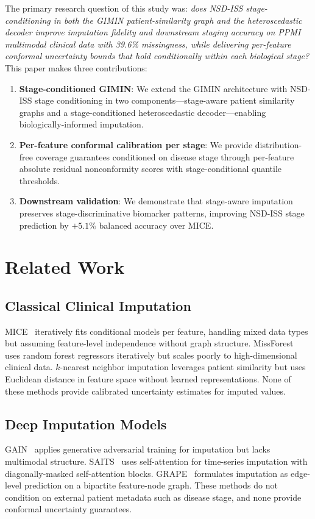 The primary research question of this study was: \emph{does NSD-ISS stage-conditioning in both the GIMIN patient-similarity graph and the heteroscedastic decoder improve imputation fidelity and downstream staging accuracy on PPMI multimodal clinical data with 39.6\% missingness, while delivering per-feature conformal uncertainty bounds that hold conditionally within each biological stage?} This paper makes three contributions:
\begin{enumerate}
    \item \textbf{Stage-conditioned GIMIN}: We extend the GIMIN architecture with NSD-ISS stage conditioning in two components---stage-aware patient similarity graphs and a stage-conditioned heteroscedastic decoder---enabling biologically-informed imputation.
    \item \textbf{Per-feature conformal calibration per stage}: We provide distribution-free coverage guarantees conditioned on disease stage through per-feature absolute residual nonconformity scores with stage-conditional quantile thresholds.
    \item \textbf{Downstream validation}: We demonstrate that stage-aware imputation preserves stage-discriminative biomarker patterns, improving NSD-ISS stage prediction by $+5.1\%$ balanced accuracy over MICE.
\end{enumerate}

\section{Related Work}
\label{p2:sec:related}

\subsection{Classical Clinical Imputation}
MICE~\cite{buuren2011} iteratively fits conditional models per feature, handling mixed data types but assuming feature-level independence without graph structure. MissForest~\cite{stekhoven2012} uses random forest regressors iteratively but scales poorly to high-dimensional clinical data. $k$-nearest neighbor imputation leverages patient similarity but uses Euclidean distance in feature space without learned representations. None of these methods provide calibrated uncertainty estimates for imputed values.

\subsection{Deep Imputation Models}
GAIN~\cite{yoon2018} applies generative adversarial training for imputation but lacks multimodal structure. SAITS~\cite{du2023} uses self-attention for time-series imputation with diagonally-masked self-attention blocks. GRAPE~\cite{you2020} formulates imputation as edge-level prediction on a bipartite feature-node graph. These methods do not condition on external patient metadata such as disease stage, and none provide conformal uncertainty guarantees.

